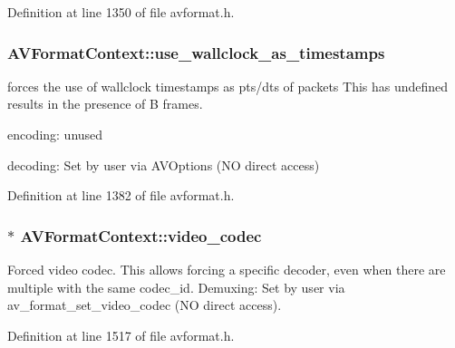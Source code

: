 Definition at line 1350 of file avformat.\+h.

\subsubsection[{\texorpdfstring{use\+\_\+wallclock\+\_\+as\+\_\+timestamps}{use_wallclock_as_timestamps}}]{ A\+V\+Format\+Context\+::use\+\_\+wallclock\+\_\+as\+\_\+timestamps}\hypertarget{struct_a_v_format_context_a90251622aa2b78badbb846274aff4633}{}\label{struct_a_v_format_context_a90251622aa2b78badbb846274aff4633}
forces the use of wallclock timestamps as pts/dts of packets This has undefined results in the presence of B frames.
\begin{DoxyItemize}
\item encoding\+: unused
\item decoding\+: Set by user via A\+V\+Options (NO direct access) 
\end{DoxyItemize}

Definition at line 1382 of file avformat.\+h.

\subsubsection[{\texorpdfstring{video\+\_\+codec}{video_codec}}]{$\ast$ A\+V\+Format\+Context\+::video\+\_\+codec}\hypertarget{struct_a_v_format_context_a1891d82f7f853a16ebcba7cae939c4f0}{}\label{struct_a_v_format_context_a1891d82f7f853a16ebcba7cae939c4f0}
Forced video codec. This allows forcing a specific decoder, even when there are multiple with the same codec\+\_\+id. Demuxing\+: Set by user via av\+\_\+format\+\_\+set\+\_\+video\+\_\+codec (NO direct access). 

Definition at line 1517 of file avformat.\+h.

